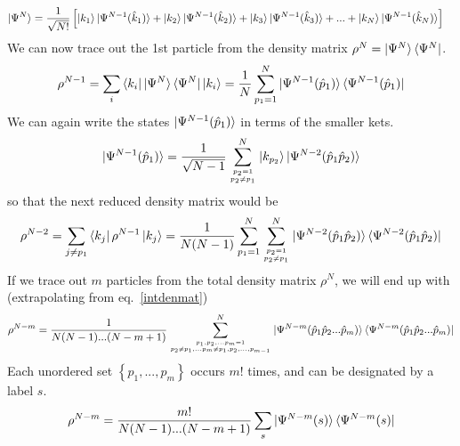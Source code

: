 \documentclass[12pt,twoside]{article}
\numberwithin{equation}{section}
\begin{document}
{\begin{equation}
\begin{aligned}
	\ket{\Psi^N} &=\frac{1}{\sqrt{N!}}\left[\ket{k_1} \ket{\Psi^{N-1}(\hat k_1)} + \ket{k_2} \ket{\Psi^{N-1}(\hat k_2)} + \ket{k_3} \ket{\Psi^{N-1}(\hat k_3)} + ... + \ket{k_N} \ket{\Psi^{N-1}(\hat k_N)}\right]
\end{aligned}\end{equation}
We can now trace out the 1st particle from the density matrix \(\rho^N = \ket{\Psi^N}\bra{\Psi^N}\).
\begin{equation}\begin{aligned}
	\rho^{N-1} = \sum_{i}\bra{k_i}\ket{\Psi^N}\bra{\Psi^N}\ket{k_i} = \frac{1}{N}\sum_{p_1=1}^N \ket{\Psi^{N-1}(\hat p_1)}\bra{\Psi^{N-1}(\hat p_1)}
\end{aligned}\end{equation}
We can again write the states \(\ket{\Psi^{N-1}(\hat p_1)}\) in terms of the smaller kets.
\begin{equation}\begin{aligned}
	\ket{\Psi^{N-1}(\hat p_1)} = \frac{1}{\sqrt{N-1}}\sum_{p_2=1\atop{p_2 \neq p_1}}^N \ket{k_{p_2}} \ket{\Psi^{N-2}(\hat p_1 \hat p_2)}
\end{aligned}\end{equation}
so that the next reduced density matrix would be
\begin{equation}\begin{aligned}
	\label{intdenmat}
	\rho^{N-2} = \sum_{j\neq p_1}\bra{k_j}\rho^{N-1}\ket{k_j} = \frac{1}{N(N-1)}\sum_{p_1=1}^N\sum_{p_2=1\atop{p_2 \neq p_1}}^N \ket{\Psi^{N-2}(\hat p_1 \hat p_2)}\bra{\Psi^{N-2}(\hat p_1 \hat p_2)}
\end{aligned}\end{equation}
If we trace out \(m\) particles from the total density matrix  \(\rho^N\), we will end up with (extrapolating from eq.~\ref{intdenmat})
\begin{equation}\begin{aligned}
	\rho^{N-m} = \frac{1}{N(N-1)...(N-m+1)}\sum_{p_1,p_2,...p_m=1\atop{p_2 \neq p_1,... p_m\neq p_1,p_2,...,p_{m-1}}}^N\ket{\Psi^{N-m}(\hat p_1 \hat p_2...\hat p_m)}\bra{\Psi^{N-m}(\hat p_1 \hat p_2...\hat p_m)}
\end{aligned}\end{equation}
Each unordered set \(\left\{ p_1, ..., p_m \right\} \) occurs \(m!\) times, and can be designated by a label \(s\).
\begin{equation}\begin{aligned}
	\rho^{N-m} = \frac{m!}{N(N-1)...(N-m+1)}\sum_{s}\ket{\Psi^{N-m}(s)}\bra{\Psi^{N-m}(s)}
\end{aligned}\end{equation}
}
\end{document}
